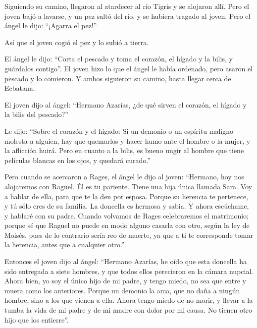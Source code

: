  Siguiendo su camino, llegaron al atardecer al río Tigris
y se alojaron allí.  Pero el joven bajó a lavarse, y un
pez saltó del río, y se hubiera tragado al joven.  Pero el
ángel le dijo: ``¡Agarra el pez!''

Así que el joven cogió el pez y lo subió a tierra.

 El ángel le dijo: ``Corta el pescado y toma el corazón,
el hígado y la bilis, y guárdalos contigo''.  El joven
hizo lo que el ángel le había ordenado, pero asaron el pescado y lo
comieron. Y ambos siguieron su camino, hasta llegar cerca de Ecbatana.

 El joven dijo al ángel: ``Hermano Azarías, ¿de qué sirven
el corazón, el hígado y la bilis del pescado?''

 Le dijo: ``Sobre el corazón y el hígado: Si un demonio o
un espíritu maligno molesta a alguien, hay que quemarlos y hacer humo
ante el hombre o la mujer, y la aflicción huirá.  Pero en
cuanto a la bilis, es bueno ungir al hombre que tiene películas blancas
en los ojos, y quedará curado.''

 Pero cuando se acercaron a Rages,  el
ángel le dijo al joven: ``Hermano, hoy nos alojaremos con Raguel. Él es
tu pariente. Tiene una hija única llamada Sara. Voy a hablar de ella,
para que te la den por esposa.  Porque su herencia te
pertenece, y tú sólo eres de su familia.  La doncella es
hermosa y sabia. Y ahora escúchame, y hablaré con su padre. Cuando
volvamos de Rages celebraremos el matrimonio; porque sé que Raguel no
puede en modo alguno casarla con otro, según la ley de Moisés, pues de
lo contrario sería reo de muerte, ya que a ti te corresponde tomar la
herencia, antes que a cualquier otro.''

 Entonces el joven dijo al ángel: ``Hermano Azarías, he
oído que esta doncella ha sido entregada a siete hombres, y que todos
ellos perecieron en la cámara nupcial.  Ahora bien, yo
soy el único hijo de mi padre, y tengo miedo, no sea que entre y muera
como los anteriores. Porque un demonio la ama, que no daña a ningún
hombre, sino a los que vienen a ella. Ahora tengo miedo de no morir, y
llevar a la tumba la vida de mi padre y de mi madre con dolor por mi
causa. No tienen otro hijo que los entierre''.

